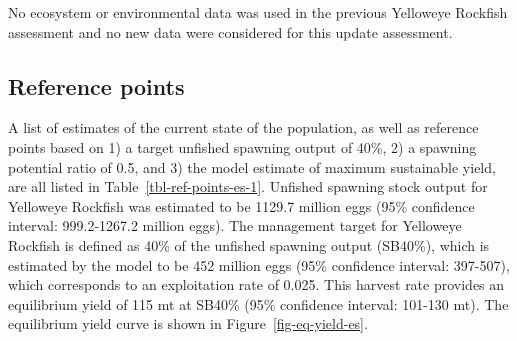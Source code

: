 \documentclass[
]{scrartcl}
\begin{document}
No ecosystem or environmental data was used in the previous Yelloweye
Rockfish assessment and no new data were considered for this update
assessment.

\subsection*{Reference points}\label{reference-points}

A list of estimates of the current state of the population, as well as
reference points based on 1) a target unfished spawning output of 40\%,
2) a spawning potential ratio of 0.5, and 3) the model estimate of
maximum sustainable yield, are all listed in
Table~\ref{tbl-ref-points-es-1}. Unfished spawning stock output for
Yelloweye Rockfish was estimated to be 1129.7 million eggs (95\%
confidence interval: 999.2-1267.2 million eggs). The management target
for Yelloweye Rockfish is defined as 40\% of the unfished spawning
output (SB40\%), which is estimated by the model to be 452 million eggs
(95\% confidence interval: 397-507), which corresponds to an
exploitation rate of 0.025. This harvest rate provides an equilibrium
yield of 115 mt at SB40\% (95\% confidence interval: 101-130 mt). The
equilibrium yield curve is shown in Figure~\ref{fig-eq-yield-es}.

\clearpage

\begingroup
\fontsize{9.0pt}{10.8pt}\selectfont
\end{document}
